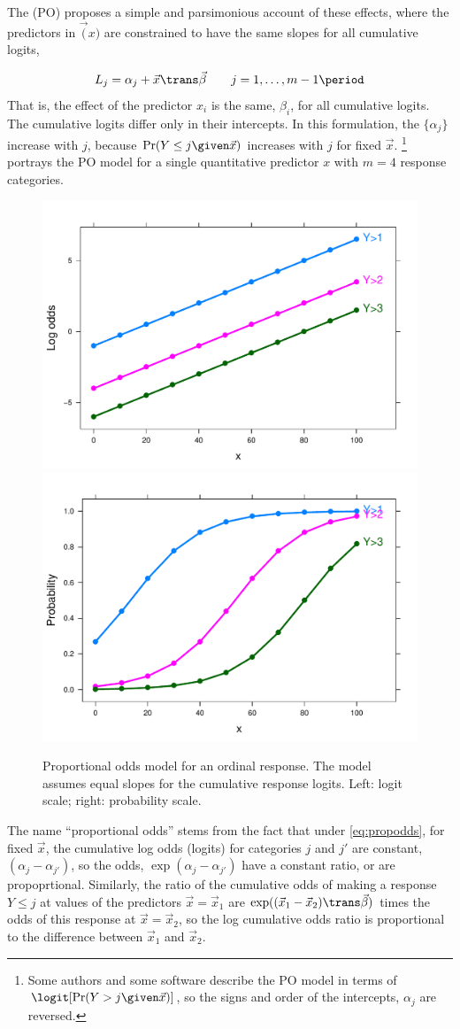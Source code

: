 \documentclass[11pt]{book}
\begin{document}
The  (PO) \citep{Mccullagh:1980} proposes a simple
and parsimonious account of these effects, where the predictors in $\vec(x)$
are constrained to have the same slopes for all cumulative logits,

\begin{equation}\label{eq:propodds}
  L_j = \alpha_j + \vec{x}\trans \vec{\beta} \quad\quad j=1, \dots , m-1 \period
\end{equation}
That is, the effect of the predictor $x_i$ is the same, $\beta_i$, for all
cumulative logits. The cumulative logits differ only in their intercepts.
In this formulation, the $\{ \alpha_j \}$ increase with $j$, because
$\Pr (Y \le j \given \vec{x})$ increases with $j$ for fixed $\vec{x}$.%
\footnote{
Some authors and some software describe the PO model in terms of
$\logit [\Pr (Y > j \given \vec{x})]$, so the signs and order of the
intercepts, $\alpha_j$ are reversed.
}
 portrays the PO model for a single quantitative predictor
$x$ with $m=4$ response categories.  

\begin{figure}
 \centering
 \includegraphics[width=.49\textwidth]{ch07/fig/podds2}
 \includegraphics[width=.49\textwidth]{ch07/fig/podds1}
 \caption{Proportional odds model for an ordinal response.  The model assumes equal slopes for the cumulative response logits. Left: logit scale; right: probability scale.}
 \label{fig:podds}
\end{figure}

The name ``proportional odds'' stems from the fact that under \eqref{eq:propodds},
for fixed $\vec{x}$, the cumulative log odds (logits) for categories $j$ and $j\prime$
are constant, $(\alpha_j - \alpha_{j\prime})$, so the odds, $\exp (\alpha_j - \alpha_{j\prime})$
have a constant ratio, or are propoprtional.
Similarly, 
the ratio of the cumulative odds of making a response $Y \le j$ at values of the
predictors $\vec{x} = \vec{x}_1$ are $\exp( (\vec{x}_1 - \vec{x}_2)\trans \vec{\beta} )$
times the odds of this response at $\vec{x} = \vec{x}_2$, so the log cumulative odds
ratio is proportional to the difference between $\vec{x}_1$ and $\vec{x}_2$.
\end{document}
